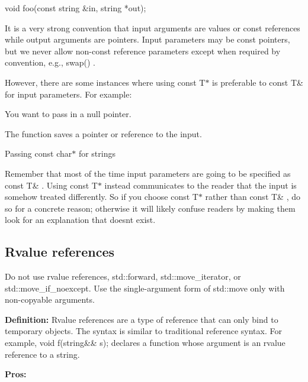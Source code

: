 \begin{DoxyCode}
\textcolor{keywordtype}{void} foo(\textcolor{keyword}{const} \textcolor{keywordtype}{string} &in, \textcolor{keywordtype}{string} *out);
\end{DoxyCode}


It is a very strong convention that input arguments are values or const references while output arguments are pointers. Input parameters may be const pointers, but we never allow non-\/const reference parameters except when required by convention, e.\+g., {\ttfamily swap()} .

However, there are some instances where using {\ttfamily const T$\ast$} is preferable to {\ttfamily const T\&} for input parameters. For example\+:


\begin{DoxyItemize}
\item You want to pass in a null pointer.
\item The function saves a pointer or reference to the input.
\item Passing {\ttfamily const char$\ast$} for strings
\end{DoxyItemize}

Remember that most of the time input parameters are going to be specified as {\ttfamily const T\&} . Using {\ttfamily const T$\ast$} instead communicates to the reader that the input is somehow treated differently. So if you choose {\ttfamily const T$\ast$} rather than {\ttfamily const T\&} , do so for a concrete reason; otherwise it will likely confuse readers by making them look for an explanation that doesn\textquotesingle{}t exist.

\subsection*{Rvalue references}

Do not use rvalue references, {\ttfamily std\+::forward}, {\ttfamily std\+::move\+\_\+iterator}, or {\ttfamily std\+::move\+\_\+if\+\_\+noexcept}. Use the single-\/argument form of {\ttfamily std\+::move} only with non-\/copyable arguments.

{\bfseries Definition\+:} Rvalue references are a type of reference that can only bind to temporary objects. The syntax is similar to traditional reference syntax. For example, void f(string\&\& s); declares a function whose argument is an rvalue reference to a string.

{\bfseries Pros\+:}


